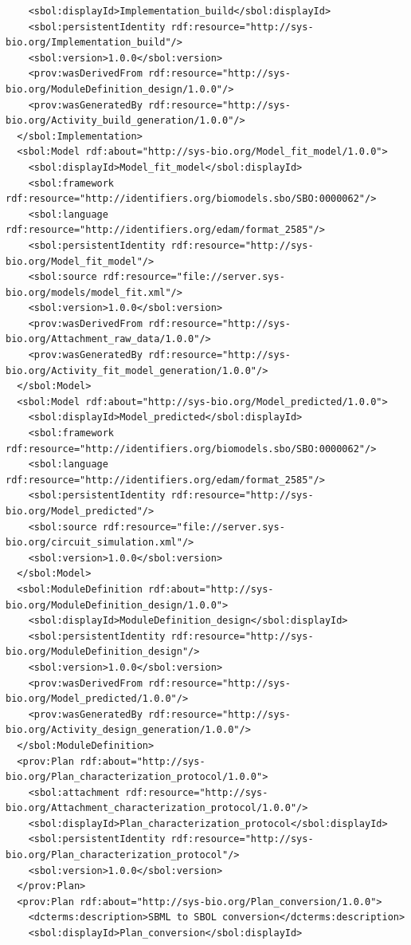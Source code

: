 \begin{lstlisting}
    <sbol:displayId>Implementation_build</sbol:displayId>
    <sbol:persistentIdentity rdf:resource="http://sys-bio.org/Implementation_build"/>
    <sbol:version>1.0.0</sbol:version>
    <prov:wasDerivedFrom rdf:resource="http://sys-bio.org/ModuleDefinition_design/1.0.0"/>
    <prov:wasGeneratedBy rdf:resource="http://sys-bio.org/Activity_build_generation/1.0.0"/>
  </sbol:Implementation>
  <sbol:Model rdf:about="http://sys-bio.org/Model_fit_model/1.0.0">
    <sbol:displayId>Model_fit_model</sbol:displayId>
    <sbol:framework rdf:resource="http://identifiers.org/biomodels.sbo/SBO:0000062"/>
    <sbol:language rdf:resource="http://identifiers.org/edam/format_2585"/>
    <sbol:persistentIdentity rdf:resource="http://sys-bio.org/Model_fit_model"/>
    <sbol:source rdf:resource="file://server.sys-bio.org/models/model_fit.xml"/>
    <sbol:version>1.0.0</sbol:version>
    <prov:wasDerivedFrom rdf:resource="http://sys-bio.org/Attachment_raw_data/1.0.0"/>
    <prov:wasGeneratedBy rdf:resource="http://sys-bio.org/Activity_fit_model_generation/1.0.0"/>
  </sbol:Model>
  <sbol:Model rdf:about="http://sys-bio.org/Model_predicted/1.0.0">
    <sbol:displayId>Model_predicted</sbol:displayId>
    <sbol:framework rdf:resource="http://identifiers.org/biomodels.sbo/SBO:0000062"/>
    <sbol:language rdf:resource="http://identifiers.org/edam/format_2585"/>
    <sbol:persistentIdentity rdf:resource="http://sys-bio.org/Model_predicted"/>
    <sbol:source rdf:resource="file://server.sys-bio.org/circuit_simulation.xml"/>
    <sbol:version>1.0.0</sbol:version>
  </sbol:Model>
  <sbol:ModuleDefinition rdf:about="http://sys-bio.org/ModuleDefinition_design/1.0.0">
    <sbol:displayId>ModuleDefinition_design</sbol:displayId>
    <sbol:persistentIdentity rdf:resource="http://sys-bio.org/ModuleDefinition_design"/>
    <sbol:version>1.0.0</sbol:version>
    <prov:wasDerivedFrom rdf:resource="http://sys-bio.org/Model_predicted/1.0.0"/>
    <prov:wasGeneratedBy rdf:resource="http://sys-bio.org/Activity_design_generation/1.0.0"/>
  </sbol:ModuleDefinition>
  <prov:Plan rdf:about="http://sys-bio.org/Plan_characterization_protocol/1.0.0">
    <sbol:attachment rdf:resource="http://sys-bio.org/Attachment_characterization_protocol/1.0.0"/>
    <sbol:displayId>Plan_characterization_protocol</sbol:displayId>
    <sbol:persistentIdentity rdf:resource="http://sys-bio.org/Plan_characterization_protocol"/>
    <sbol:version>1.0.0</sbol:version>
  </prov:Plan>
  <prov:Plan rdf:about="http://sys-bio.org/Plan_conversion/1.0.0">
    <dcterms:description>SBML to SBOL conversion</dcterms:description>
    <sbol:displayId>Plan_conversion</sbol:displayId>

\end{lstlisting}
